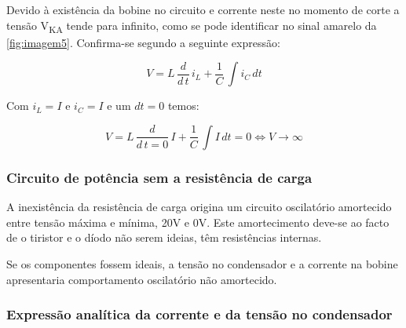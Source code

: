 \documentclass[a4paper,11pt]{article}
\numberwithin{equation}{section}
\begin{document}
Devido à existência da bobine no circuito e corrente neste no momento de corte a tensão  V\textsubscript{KA} tende para infinito, como se pode identificar no sinal amarelo da \autoref{fig:imagem5}. Confirma-se segundo a seguinte expressão:
 
 \begin{equation}
 	\label{eq:ex_1}
 	V = L\,\frac{d}{d\,t}\,i_L + \frac{1}{C}\,\int i_C\,dt
 \end{equation}

Com $i_L = I$ e $i_C = I$ e um $dt = 0$ temos:

 \begin{equation}
 	\label{eq:ex_2}
 	V = L\,\frac{d}{d\,t = 0}\,I + \frac{1}{C}\,\int I\,dt = 0 \Leftrightarrow V \rightarrow \infty
 \end{equation}	

\subsubsection{Circuito de potência sem a resistência de carga}
A inexistência da resistência de carga origina um circuito oscilatório amortecido entre tensão máxima e mínima, 20V e 0V. Este amortecimento deve-se ao facto de o tiristor e o díodo não serem ideias, têm resistências internas.

Se os componentes fossem ideais, a tensão no condensador e a corrente na bobine apresentaria comportamento oscilatório não amortecido.

\subsubsection{Expressão analítica da corrente e da tensão no condensador}


%
\end{document}

